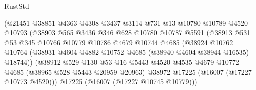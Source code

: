 \begin{lexlean}{RustStd}
\begin{coremodule}
                                (@21451
                                  @38851
                                  @4363
                                  @4308
                                  @3437
                                  @3114
                                  @731
                                  @13
                                  @10780
                                  @10789
                                  @4520
                                  @10793
                                  (@38903
                                    @565
                                    @3436
                                    @346
                                    @628
                                    @10780
                                    @10787
                                    @5591
                                    (@38913
                                      @531
                                      @53
                                      @345
                                      @10766
                                      @10779
                                      @10786
                                      @4679
                                      @10744
                                      @4685
                                      (@38924
                                        @10762
                                        @10764
                                        (@38931
                                          @4604
                                          @4882
                                          @10752
                                          @4685
                                          (@38940 @4604 @38944 @16535)
                                          @18744))
                                      (@38912
                                        @529
                                        @130
                                        @53
                                        @16
                                        @5443
                                        @4520
                                        @4535
                                        @4679
                                        @10772
                                        @4685
                                        (@38965 @528 @5443 @20959 @20963)
                                        @38972
                                        @17225
                                        (@16007 (@17227 @10773 @4520)))
                                      @17225
                                      (@16007 (@17227 @10745 @10779)))

\end{coremodule}
\end{lexlean}

